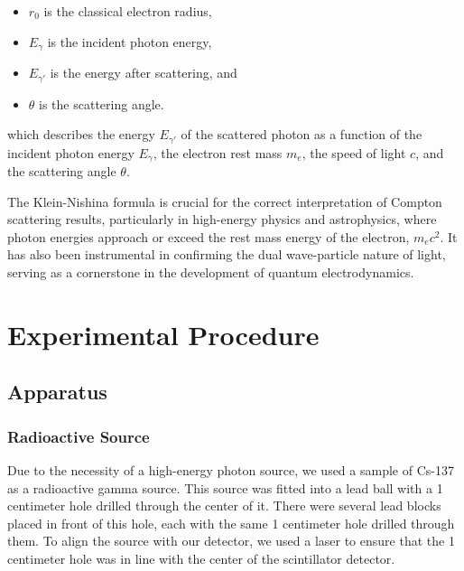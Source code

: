 \documentclass[10pt,letterpaper,onecolumn]{article}
\begin{document}
\begin{itemize}
    \item  $r_0$ is the classical electron radius, 
    \item $E_{\gamma}$ is the incident photon energy, 
    \item $E_{\gamma'}$ is the energy after scattering, and
    \item  $\theta$ is the scattering angle.
    \end{itemize}   
which describes the energy \( E_{\gamma'} \) of the scattered photon as a function of the incident photon energy \( E_{\gamma} \), the electron rest mass \( m_e \), the speed of light \( c \), and the scattering angle \( \theta \).


The Klein-Nishina formula is crucial for the correct interpretation of Compton scattering results, particularly in high-energy physics and astrophysics, where photon energies approach or exceed the rest mass energy of the electron, \( m_e c^2 \). It has also been instrumental in confirming the dual wave-particle nature of light, serving as a cornerstone in the development of quantum electrodynamics.

\section{Experimental Procedure}
\subsection{Apparatus}
\subsubsection*{Radioactive Source}
Due to the necessity of a high-energy photon source, we used a sample of Cs-137 as a radioactive gamma source. This source was fitted into a lead ball with a 1 centimeter hole drilled through the center of it. There were several lead blocks placed in front of this hole, each with the same 1 centimeter hole drilled through them. To align the source with our detector, we used a laser to ensure that the 1 centimeter hole was in line with the center of the scintillator detector. 
\end{document}
